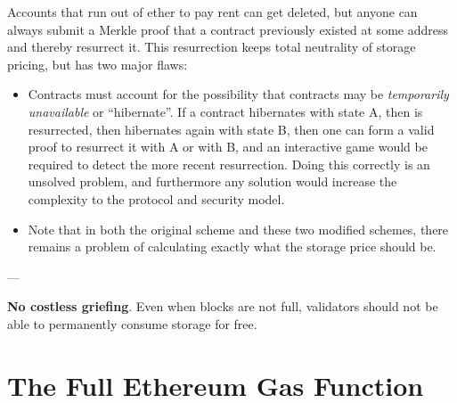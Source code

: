 \documentclass[12pt, final]{article}
\begin{document}
Accounts that run out of ether to pay rent can get deleted, but anyone can always submit a Merkle proof that a contract previously existed at some address and thereby resurrect it. This resurrection keeps total neutrality of storage pricing, but has two major flaws:

\begin{itemize}
\item Contracts must account for the possibility that contracts may be \emph{temporarily unavailable} or ``hibernate''. 
If a contract hibernates with state A, then is resurrected, then hibernates again with state B, then one can form a valid proof to resurrect it with A or with B, and an interactive game would be required to detect the more recent resurrection. Doing this correctly is an unsolved problem, and furthermore any solution would increase the complexity to the protocol and security model.

\item Note that in both the original scheme and these two modified schemes, there remains a problem of calculating exactly what the storage price should be.
\end{itemize}

---


\textbf{No costless griefing}. Even when blocks are not full, validators should not be able to permanently consume storage for free.










\section{The Full Ethereum Gas Function}
\label{appendix:gasfunction}
\end{document}
